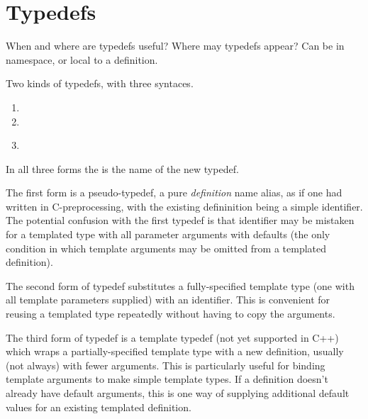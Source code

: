 
\chapter{Typedefs}
\label{sec:typedefs}

When and where are typedefs useful?  
Where may typedefs appear?
Can be in namespace, or local to a definition.  

Two kinds of typedefs, with three syntaces.  

\begin{enumerate}
\item {}  \ttt{;}
\item {}  
	\ttt{<}  \ttt{>} \ttt{;}
\item {} \ttt{<}  \ttt{>}\\
	  
	\ttt{<}  \ttt{>} \ttt{;}
\end{enumerate}

In all three forms the  is the name of the new
typedef.  

The first form is a pseudo-typedef, a pure \emph{definition} name alias, 
as if one had written 
   in C-preprocessing, 
with the existing defininition being a simple identifier.  
The potential confusion with the first typedef is that 
 identifier may be mistaken for a templated type
with all parameter arguments with defaults 
(the only condition in which template arguments 
may be omitted from a templated definition).  

The second form of typedef substitutes a fully-specified template type
(one with all template parameters supplied) with an identifier.  
This is convenient for reusing a templated type repeatedly without
having to copy the arguments.  

The third form of typedef is a template typedef (not yet supported in C++)
which wraps a partially-specified template type with a new definition, 
usually (not always) with fewer arguments.  
This is particularly useful for binding template arguments
to make simple template types.  
If a definition doesn't already have default arguments, 
this is one way of supplying additional default values 
for an existing templated definition.  

